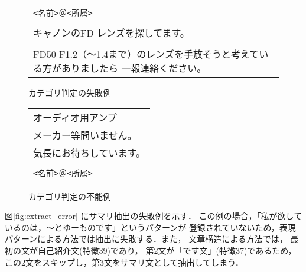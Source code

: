 \begin{figure}
\begin{screen} \small
\noindent
\begin{tabular}{@{}p{\textwidth}@{}}
\verb+<名前>＠<所属>+ \\
\\
キャノンのFD レンズを探してます。\\
\\
FD50 F1.2（〜1.4まで）のレンズを手放そうと考えている方がありましたら
一報連絡ください。
\end{tabular}
\end{screen}
\caption{カテゴリ判定の失敗例}
\label{fig:cat_error}
\end{figure}

\begin{figure}
\begin{screen} \small
\noindent
\begin{tabular}{@{}p{\textwidth}@{}}
オーディオ用アンプ \\
メーカー等問いません。\\
気長にお待ちしています。\\
\\
\verb+<名前>＠<所属>+
\end{tabular}
\end{screen}
\caption{カテゴリ判定の不能例}
\label{fig:cat_fail}
\end{figure}


図\ref{fig:extract_error} にサマリ抽出の失敗例を示す．
この例の場合，「私が欲しているのは，〜とゆーものです」というパターンが
登録されていないため，表現パターンによる方法では抽出に失敗する．また，
文章構造による方法では，
最初の文が自己紹介文(特徴39)であり，
第2文が「です文」(特徴37)であるため，
この2文をスキップし，第3文をサマリ文として抽出してしまう．

